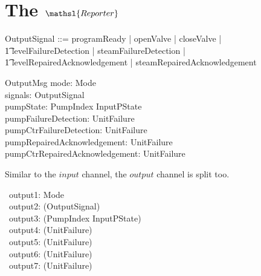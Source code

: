 \documentclass{report} %
\begin{document}

\chapter{The $\mathsl{Reporter}$}

\begin{zed}
  OutputSignal ::= programReady  | openValve | closeValve | \\
      \t1 levelFailureDetection | steamFailureDetection | \\
      \t1 levelRepairedAcknowledgement | steamRepairedAcknowledgement
\end{zed}

\begin{schema}{OutputMsg}
  mode: Mode
  \\ %
  signals: \power OutputSignal
  \\ %
  pumpState: PumpIndex \fun InputPState
  \\ %
  pumpFailureDetection: \power UnitFailure 
  \\ %
  pumpCtrFailureDetection: \power UnitFailure 
  \\ %
  pumpRepairedAcknowledgement: \power UnitFailure 
  \\ %
  pumpCtrRepairedAcknowledgement: \power UnitFailure 
\end{schema}

Similar to the $input$ channel, the $output$ channel is split too.
\begin{circus}

  \circchannel\ output1: Mode \\ %
  \circchannel\ output2: (\power OutputSignal) \\ %
  \circchannel\ output3: (PumpIndex \fun InputPState) \\ %
  \circchannel\ output4: (\power UnitFailure) \\ %
  \circchannel\ output5: (\power UnitFailure) \\ %
  \circchannel\ output6: (\power UnitFailure) \\ %
  \circchannel\ output7: (\power UnitFailure) %
                    \\
\end{circus}
\end{document}
